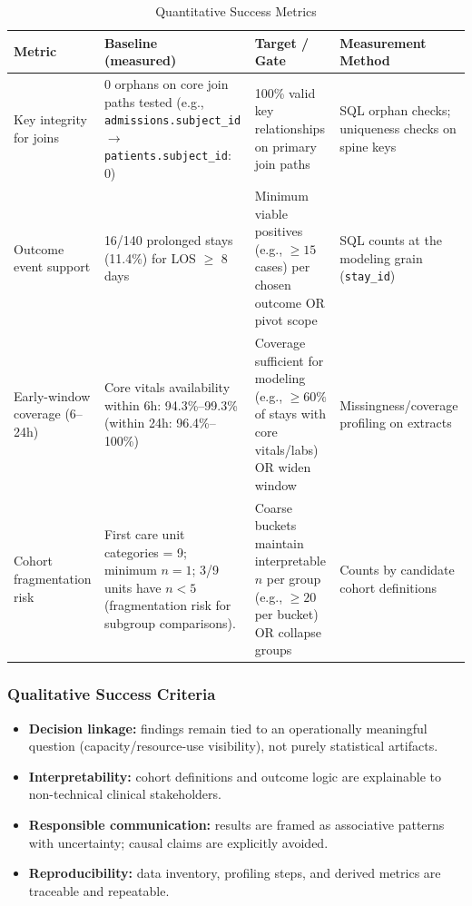 \documentclass[12pt]{article}
\begin{document}
\begin{table}[H]
\centering
\caption{Quantitative Success Metrics}
\label{tab:quant_success}
\begin{tabular}{@{}L{3.4cm} L{4cm} L{5.1cm} L{3.5cm}@{}}
\toprule
\textbf{Metric} & \textbf{Baseline \newline(measured)} & \textbf{Target / Gate} & \textbf{Measurement Method} \\
\midrule
Key integrity for joins
& 0 orphans on core join paths tested (e.g., \texttt{admissions.subject\_id} $\rightarrow$ \texttt{patients.subject\_id}: 0)
& 100\% valid key relationships on primary join paths
& SQL orphan checks; uniqueness checks on spine keys \\

Outcome event support
& 16/140 prolonged stays (11.4\%) for LOS $\ge$ 8 days
& Minimum viable positives (e.g., $\ge 15$ cases) per chosen outcome OR pivot scope
& SQL counts at the modeling grain (\texttt{stay\_id}) \\

Early-window coverage (6--24h)
& Core vitals availability within 6h: 94.3\%--99.3\% (within 24h: 96.4\%--100\%)

& Coverage sufficient for modeling (e.g., $\ge 60\%$ of stays with core vitals/labs) OR widen window
& Missingness/coverage profiling on extracts \\

Cohort fragmentation risk
& First care unit categories = 9; minimum $n=1$; 3/9 units have $n<5$ (fragmentation risk for subgroup comparisons).

& Coarse buckets maintain interpretable $n$ per group (e.g., $\ge 20$ per bucket) OR collapse groups
& Counts by candidate cohort definitions \\

\bottomrule
\end{tabular}
\end{table}




\subsubsection*{Qualitative Success Criteria}
\begin{itemize}[leftmargin=1.5em]
    \item \textbf{Decision linkage:} findings remain tied to an operationally meaningful question (capacity/resource-use visibility), not purely statistical artifacts.
    \item \textbf{Interpretability:} cohort definitions and outcome logic are explainable to non-technical clinical stakeholders.
    \item \textbf{Responsible communication:} results are framed as associative patterns with uncertainty; causal claims are explicitly avoided.
    \item \textbf{Reproducibility:} data inventory, profiling steps, and derived metrics are traceable and repeatable.
\end{itemize}
\end{document}
